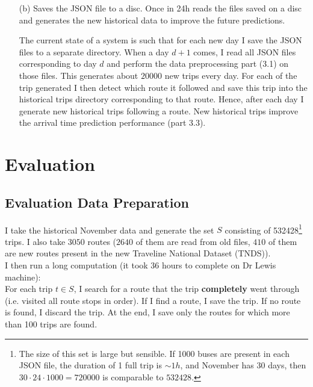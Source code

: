 \documentclass[12pt,a4paper,oneside,openright]{report}
\begin{document}
\begin{enumerate}
This is how for \textbf{each} bus I \textbf{independently} process its new GPS data
and predict the arrival time to the next bus stops. Currently one machine is
waiting for $t$ sec., then using the new GPS data to handle $50$ buses in 
$30 - t$ sec.\footnote{Of course, I am trying to minimise $t$ and maximise the number of buses
handled $30 - t$ sec.}

\item[(b)] Saves the JSON file to a disc. Once in 24h reads the files saved on a disc
and generates the new historical data to improve the future predictions.

The current state of a system is such that for each new day I save the JSON files
to a separate directory. When a day $d+1$ comes, I read all JSON files corresponding
to day $d$ and perform the data preprocessing part (3.1) on those files. This generates
about $20000$ new trips every day. For each of the trip generated I then detect
which route it followed and save this trip into the historical trips directory
corresponding to that route. Hence, after each day I generate new historical trips
following a route. New historical trips improve the arrival time prediction
performance (part 3.3).

\end{enumerate}

\chapter{Evaluation}

\section{Evaluation Data Preparation}


I take the historical November data and generate the set $S$ consisting of 532428\footnote{
The size of this set is large but sensible. If 1000 buses are present in each JSON file,
the duration of 1 full trip is $\sim1h$, and November has 30 days, 
then $30 \cdot 24 \cdot 1000 = 720000$ is comparable to $532428$.} trips. I also take $3050$ routes
($2640$ of them are read from old files, $410$ of them are new routes present
in the new Traveline National Dataset (TNDS)). \\

I then run a long computation (it took 36 hours to complete on Dr Lewis machine): \\

For each trip $t \in S$, I search for a route that the trip \textbf{completely}
went through (i.e. visited all route stops in order). If I find a route, I save the trip. If no route is found, I discard the
trip. At the end, I save only the routes for which more than 100 trips 
are found. \\
\end{document}
